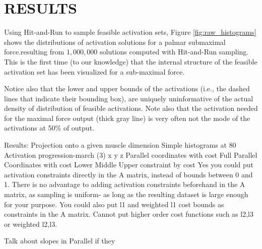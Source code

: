 \section{RESULTS}

Using Hit-and-Run to sample feasible activation sets, Figure \ref{fig:raw_histograms} shows the distributions of activation solutions for a palmar submaximal force.resulting from $1,000,000$ solutions computed with Hit-and-Run sampling. This is the first time (to our knowledge) that the internal structure of the feasible activation set has been visualized for a sub-maximal force.

Notice also that the lower and upper bounds of the activations (i.e., the dashed lines that indicate their bounding box), are uniquely uninformative of the actual density of distribution of feasible activations. Note also that the activation needed for the maximal force output (thick gray line) is very often not the mode of the activations at 50\% of output.


Results:
Projection onto a given muscle dimension
Simple histograms at 80%
Activation progression-march (3) x y z
Parallel coordinates with cost
	Full
Parallel Coordinates with cost
	Lower
	Middle
	Upper
	constraint by cost
		Yes you could put activation constraints directly in the A matrix, instead of bounds between 0 and 1. There is no advantage to adding activation constraints beforehand in the A matrix, as sampling is uniform- as long as the resulting dataset is large enough for your purpose.
		You could also put l1 and weighted l1 cost bounds as constraints in the A matrix. Cannot put higher order cost functions such as l2,l3 or weighted l2,l3.

		Talk about slopes in Parallel
		if they 

